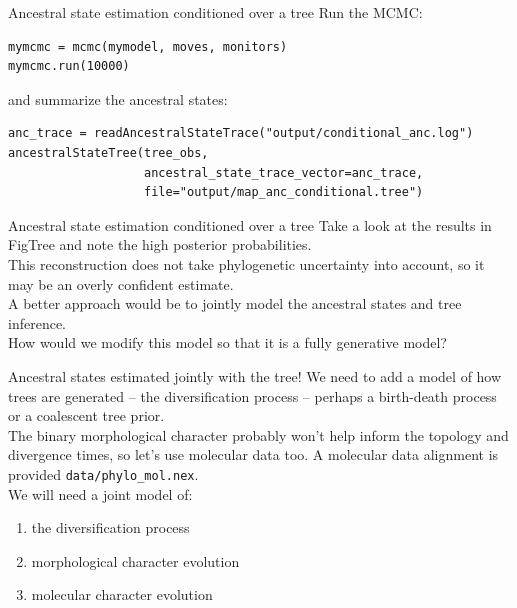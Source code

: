 \documentclass[mathserif]{beamer}
\begin{document}
\begin{frame}[fragile]
    \begin{block}{Ancestral state estimation conditioned over a tree}
    \bigskip
        Run the MCMC:
    \bigskip
    \begin{lstlisting}
mymcmc = mcmc(mymodel, moves, monitors)
mymcmc.run(10000)
    \end{lstlisting}
    \bigskip
        and summarize the ancestral states:
    \bigskip
    \begin{lstlisting}
anc_trace = readAncestralStateTrace("output/conditional_anc.log")
ancestralStateTree(tree_obs, 
                   ancestral_state_trace_vector=anc_trace, 
                   file="output/map_anc_conditional.tree")

    \end{lstlisting}
    \end{block}
\end{frame}


\begin{frame}[fragile]
    \begin{block}{Ancestral state estimation conditioned over a tree}
    \bigskip
        \small
        Take a look at the results in FigTree and note the high
        posterior probabilities.\\
    \bigskip
        This reconstruction does not take phylogenetic uncertainty
        into account, so it may be an overly confident estimate.\\
    \bigskip
        A better approach would be to jointly model the ancestral states
        and tree inference.\\
    \bigskip
        How would we modify this model so that it is
        a fully \alert{generative} model?\\
    \end{block}
\end{frame}


\begin{frame}[fragile]
    \begin{block}{Ancestral states estimated jointly with the tree!}
    \bigskip
        \small
        We need to add a model of how trees are generated
        -- the diversification process --
        perhaps a birth-death process or a coalescent tree prior.\\
    \bigskip
        The binary morphological character probably won't help inform the topology
        and divergence times, so let's use molecular data too. 
        A molecular data alignment is provided \texttt{data/phylo\_mol.nex}.\\
    \bigskip
        We will need a joint model of:
        \begin{enumerate}
            \item the diversification process
            \item morphological character evolution
            \item molecular character evolution
        \end{enumerate}
    \end{block}
\end{frame}
\end{document}

